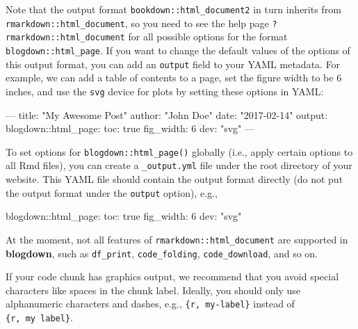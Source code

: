 \documentclass[12pt,]{krantz}
\makeatletter
\newenvironment{Shaded}{\begin{snugshade}}{\end{snugshade}}
\newcommand{\StringTok}[1]{\textcolor[rgb]{0.31,0.60,0.02}{#1}}
\newcommand{\OtherTok}[1]{\textcolor[rgb]{0.56,0.35,0.01}{#1}}
\newcommand{\FunctionTok}[1]{\textcolor[rgb]{0.00,0.00,0.00}{#1}}
\newcommand{\AttributeTok}[1]{\textcolor[rgb]{0.77,0.63,0.00}{#1}}
\newenvironment{kframe}{%
\medskip{}
\setlength{\fboxsep}{.8em}
 \def\at@end@of@kframe{}%
 \ifinner\ifhmode%
  \def\at@end@of@kframe{\end{minipage}}%
  \begin{minipage}{\columnwidth}%
 \fi\fi%
 \def\FrameCommand##1{\hskip\@totalleftmargin \hskip-\fboxsep
 \colorbox{shadecolor}{##1}\hskip-\fboxsep
     \hskip-\linewidth \hskip-\@totalleftmargin \hskip\columnwidth}%
 \MakeFramed {\advance\hsize-\width
   \@totalleftmargin\z@ \linewidth\hsize
   \@setminipage}}%
 {\par\unskip\endMakeFramed%
 \at@end@of@kframe}
\renewenvironment{Shaded}{\begin{kframe}}{\end{kframe}}
\theoremstyle{definition}
\theoremstyle{definition}
\theoremstyle{definition}
\theoremstyle{remark}
\makeatother
\begin{document}
Note that the output format \texttt{bookdown::html\_document2} in turn
inherits from \texttt{rmarkdown::html\_document}, so you need to see the
help page \texttt{?rmarkdown::html\_document} for all possible options
for the format \texttt{blogdown::html\_page}. If you want to change the
default values of the options of this output format, you can add an
\texttt{output} field to your YAML metadata. For example, we can add a
table of contents to a page, set the figure width to be 6 inches, and
use the \texttt{svg} device for plots by setting these options in YAML:

\begin{Shaded}
\begin{Highlighting}[]
\OtherTok{---}
\FunctionTok{title:}\AttributeTok{ }\StringTok{"My Awesome Post"}
\FunctionTok{author:}\AttributeTok{ }\StringTok{"John Doe"}
\FunctionTok{date:}\AttributeTok{ }\StringTok{"2017-02-14"}
\FunctionTok{output:}
  \FunctionTok{blogdown:}\AttributeTok{:html_page:}
    \FunctionTok{toc:}\AttributeTok{ true}
    \FunctionTok{fig_width:}\AttributeTok{ 6}
    \FunctionTok{dev:}\AttributeTok{ }\StringTok{"svg"}
\OtherTok{---}
\end{Highlighting}
\end{Shaded}

To set options for \texttt{blogdown::html\_page()} globally (i.e., apply
certain options to all Rmd files), you can create a
\texttt{\_output.yml} file under the root directory of your website.
This YAML file should contain the output format directly (do not put the
output format under the \texttt{output} option), e.g.,

\begin{Shaded}
\begin{Highlighting}[]
\FunctionTok{blogdown:}\AttributeTok{:html_page:}
  \FunctionTok{toc:}\AttributeTok{ true}
  \FunctionTok{fig_width:}\AttributeTok{ 6}
  \FunctionTok{dev:}\AttributeTok{ }\StringTok{"svg"}
\end{Highlighting}
\end{Shaded}

At the moment, not all features of \texttt{rmarkdown::html\_document}
are supported in \textbf{blogdown}, such as \texttt{df\_print},
\texttt{code\_folding}, \texttt{code\_download}, and so on.

If your code chunk has graphics output, we recommend that you avoid
special characters like spaces in the chunk label. Ideally, you should
only use alphanumeric characters and dashes, e.g.,
\texttt{\textasciigrave{}\textasciigrave{}\textasciigrave{}\{r,\ my-label\}}
instead of
\texttt{\textasciigrave{}\textasciigrave{}\textasciigrave{}\{r,\ my\ label\}}.
\end{document}
